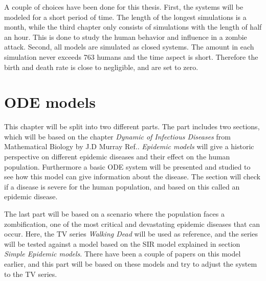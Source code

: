 \documentclass[%
twoside,                 %
final,                   %
chapterprefix=true,      %
open=right               %
10pt]{book}
\begin{document}
\vspace{3mm}




\vspace{3mm}


A couple of choices have been done for this thesis. First, the systems will be modeled for a short period of time. The length of the longest simulations is a month, while the third chapter only consists of simulations with the length of half an hour. This is done to study the human behavior and influence in a zombie attack. Second, all models are simulated as closed systems. The amount in each simulation never exceeds 763 humans and the time aspect is short. Therefore the birth and death rate is close to negligible, and are set to zero.    

\chapter{ODE models}
\label{section:ODE_models}
This chapter will be split into two different parts. The part includes two sections, which will be based on the chapter \emph{Dynamic of Infectious Diseases} from Mathematical Biology by J.D Murray Ref.\cite{murray2002mathematical}. \emph{Epidemic models} will give a historic perspective on different epidemic diseases and their effect on the human population. Furthermore a basic ODE system will be presented and studied to see how this model can give information about the disease. The section will check if a disease is severe for the human population, and based on this called an epidemic disease.


\vspace{3mm}




\vspace{3mm}


The last part will be based on a scenario where the population faces a zombification, one of the most critical and devastating epidemic diseases that can occur. Here, the TV series \emph{Walking Dead} will be used as reference, and the series will be tested against a model based on the SIR model explained in section \emph{Simple Epidemic models}. There have been a couple of papers on this model earlier, and this part will be based on these models and try to adjust the system to the TV series.     
\end{document}
